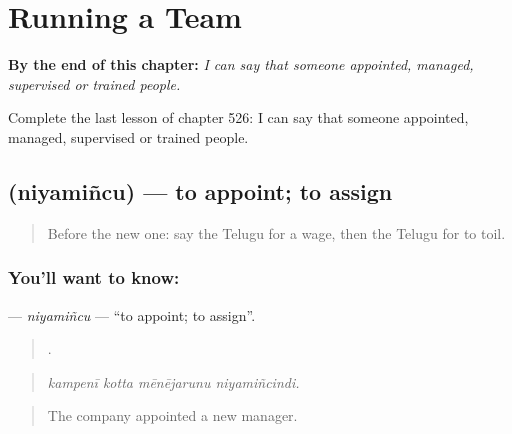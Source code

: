 
\chapter{Running a Team}
\label{ch:te-running-a-team}

\begin{chapteropening}
\textbf{By the end of this chapter:} \emph{I can say that someone appointed, managed, supervised or trained people.}

Complete the last lesson of chapter 526: I can say that someone appointed, managed, supervised or trained people.
\end{chapteropening}

\section[\texorpdfstring{\te{నియమించు} (niyamiñcu)}{నియమించు (niyamiñcu)}]{ (niyamiñcu) — to appoint; to assign}

\label{lesson:TE-C526-niyamincu}



\begin{quote}
Before the new one: say the Telugu for a wage, then the Telugu for to toil.
\end{quote}

\subsection*{You'll want to know: }
\textbf{} — \emph{niyamiñcu} — \textquotedblleft{}to appoint; to assign\textquotedblright{}.

\begin{quote}
   .
\end{quote}

\begin{quote}
\emph{kampenī kotta mēnējarunu niyamiñcindi.}
\end{quote}

\begin{quote}
The company appointed a new manager.
\end{quote}

